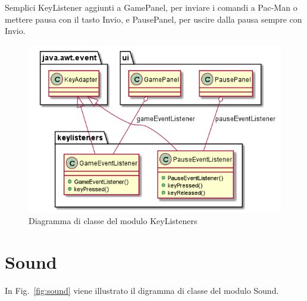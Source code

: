 \documentclass[12pt,a4paper]{report}
\begin{document}
Semplici KeyListener aggiunti a GamePanel, per inviare i comandi a Pac-Man o mettere pausa con il tasto Invio, e PausePanel, per uscire dalla pausa sempre con Invio. \newpage

\begin{figure}[tb]
\begin{center}
  \includegraphics[width=12cm]{keyListeners}
\end{center}
  \caption{Diagramma di classe del modulo KeyListeners}
  \label{fig:keyListeners}
\end{figure}


\section{Sound}\label{se:arch.sound}
In Fig.~\ref{fig:sound} viene illustrato il digramma di classe del modulo Sound.\newline
\end{document}
